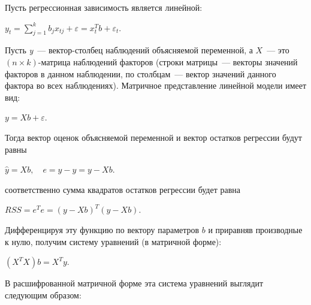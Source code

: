 \documentclass[a4paper]{article}
\begin{document}
{{{{{{{{Пусть регрессионная зависимость является линейной:

\begin{center}
 {{\(y_{t} = \sum\limits_{j = 1}^{k}b_{j}x_{tj} + \varepsilon = x_{t}^{T}b + \varepsilon_{t}\)}}.
\end{center}

Пусть \emph{y}~--- вектор-столбец наблюдений объясняемой переменной, а
{{\(X\)}}~--- это {{\(({n \times k})\)}}-матрица наблюдений факторов
(строки матрицы~--- векторы значений факторов в данном наблюдении, по
столбцам~--- вектор значений данного фактора во всех наблюдениях).
Матричное представление линейной модели имеет вид:

\begin{center}
 {{\(y = Xb + \varepsilon\)}}.
\end{center}

Тогда вектор оценок объясняемой переменной и вектор остатков регрессии
будут равны

\begin{center}
    {{\(\hat{y} = Xb,\quad e = y - \hat{y} = y - Xb\)}}.
\end{center}

соответственно сумма квадратов остатков регрессии будет равна

\begin{center}
    {{\(RSS = e^{T}e = (y - Xb)^{T}(y - Xb)\)}}.
\end{center}

Дифференцируя эту функцию по вектору параметров {{\(b\)}} и приравняв
производные к нулю, получим систему уравнений (в матричной форме):

\begin{center}
    {{\((X^{T}X)b = X^{T}y\)}}.
\end{center}

В расшифрованной матричной форме эта система уравнений выглядит
следующим образом:

}}}}}}}}
\end{document}

